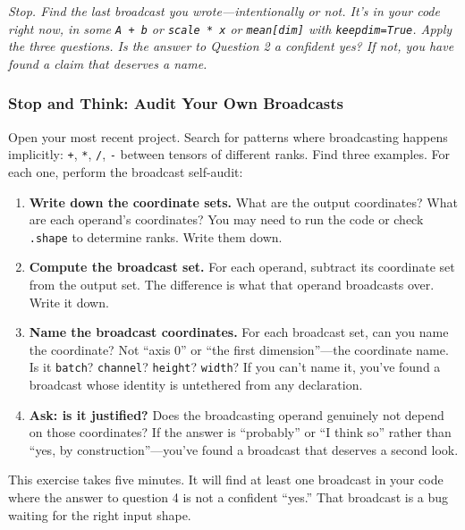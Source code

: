 \documentclass[11pt,titlepage]{article}
\begin{document}
\vspace{2em}

\emph{Stop. Find the last broadcast you wrote---intentionally or not.
It's in your code right now, in some \texttt{A\ +\ b} or
\texttt{scale\ *\ x} or \texttt{mean{[}dim{]}} with
\texttt{keepdim=True}. Apply the three questions. Is the answer to
Question 2 a confident yes? If not, you have found a claim that deserves
a name.}

\vspace{2em}

\hypertarget{stop-and-think-audit-your-own-broadcasts}{%
\subsubsection{Stop and Think: Audit Your Own
Broadcasts}\label{stop-and-think-audit-your-own-broadcasts}}

Open your most recent project. Search for patterns where broadcasting
happens implicitly: \texttt{+}, \texttt{*}, \texttt{/}, \texttt{-}
between tensors of different ranks. Find three examples. For each one,
perform the broadcast self-audit:

\begin{enumerate}
\def\labelenumi{\arabic{enumi}.}
\item
  \textbf{Write down the coordinate sets.} What are the output
  coordinates? What are each operand's coordinates? You may need to run
  the code or check \texttt{.shape} to determine ranks. Write them down.
\item
  \textbf{Compute the broadcast set.} For each operand, subtract its
  coordinate set from the output set. The difference is what that
  operand broadcasts over. Write it down.
\item
  \textbf{Name the broadcast coordinates.} For each broadcast set, can
  you name the coordinate? Not ``axis 0'' or ``the first
  dimension''---the coordinate name. Is it \texttt{batch}?
  \texttt{channel}? \texttt{height}? \texttt{width}? If you can't name
  it, you've found a broadcast whose identity is untethered from any
  declaration.
\item
  \textbf{Ask: is it justified?} Does the broadcasting operand genuinely
  not depend on those coordinates? If the answer is ``probably'' or ``I
  think so'' rather than ``yes, by construction''---you've found a
  broadcast that deserves a second look.
\end{enumerate}

This exercise takes five minutes. It will find at least one broadcast in
your code where the answer to question 4 is not a confident ``yes.''
That broadcast is a bug waiting for the right input shape.
\end{document}

